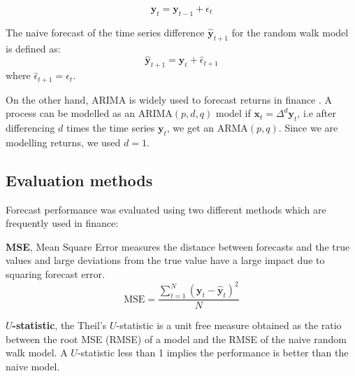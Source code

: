 \begin{equation}
\mathbf{y}_t = \mathbf{y}_{t-1} + \epsilon_{t}
\label{rwmodel}
\end{equation}

The naive forecast of the time series difference $\hat{\mathbf{y}}_{t+1}$ for the random walk model is defined as:
\begin{equation}
\hat{\mathbf{y}}_{t+1} = \mathbf{y}_t + \hat{\epsilon}_{t+1} 
\end{equation}
\noindent where  $\hat{\epsilon}_{t+1} = \epsilon_{t}$.

On the other hand, ARIMA is widely used to forecast returns in finance \cite{tsay2005}. A process can be modelled as an ARIMA$(p,d,q)$ model if $\mathbf{x}_t=\Delta^d \mathbf{y}_t $, i.e after differencing $d$ times the time series $\mathbf{y}_t$,  we get an ARMA$(p,q)$. Since we are modelling returns, we used $d=1$.


\subsection{Evaluation methods} \label{sec:evaluation}

Forecast performance was evaluated using two different methods which are frequently used in finance:
\begin{description}
\item
{\bf MSE},  Mean Square Error measures the distance between forecasts
and the true values and large deviations from the true value have a
large impact due to squaring forecast error.
\begin{equation}\label{eq:MSE}
\text{MSE} = 
\frac{\displaystyle \sum_{t=1}^{N} (\mathbf{y}_t-\hat{\mathbf{y}}_t)^2}{N}
\end{equation}
\item {\bf $U$-statistic}, the Theil's $U$-statistic \cite{theil1966} is a unit free measure obtained as the ratio between the root MSE (RMSE) of a model and the RMSE of the naive random walk model. A $U$-statistic less than 1 implies the performance is better than the naive model.
\end{description}


